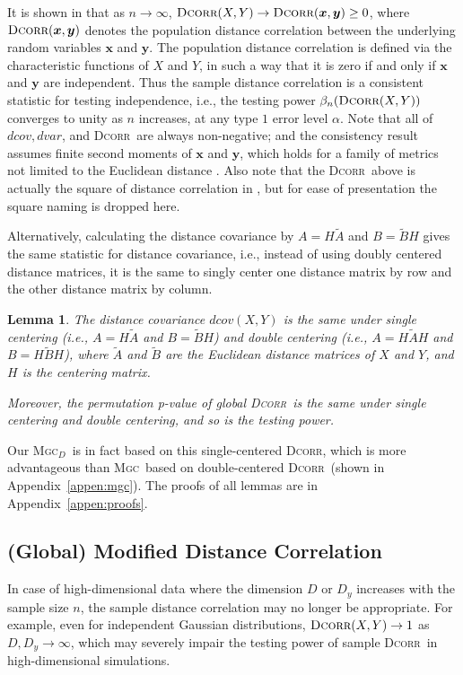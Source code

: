 \documentclass[11pt]{article}
\providecommand{\sct}[1]{{\normalfont\textsc{#1}}}
\providecommand{\mb}[1]{\boldsymbol{#1}}
\newcommand{\Mgc}{\sct{Mgc}}
\newcommand{\Mgcd}{\sct{Mgc$_D$}}
\newcommand{\Dcorr}{\sct{Dcorr}}
\newtheorem{lem}{Lemma}
\begin{document}
It is shown in \cite{SzekelyRizzoBakirov2007} that as $n \rightarrow \infty$, $\Dcorr(X,Y) \rightarrow \Dcorr(\mb{x},\mb{y}) \geq 0$, where $\Dcorr(\mb{x},\mb{y})$ denotes the population distance correlation between the underlying random variables $\mb{x}$ and $\mb{y}$. The population distance correlation is defined via the characteristic functions of $X$ and $Y$, in such a way that it is zero if and only if $\mb{x}$ and $\mb{y}$ are independent. Thus the sample distance correlation is a consistent statistic for testing independence, i.e., the testing power $\beta_{n}(\Dcorr(X,Y))$
converges to unity as $n$ increases, at any type $1$ error level $\alpha$. Note that all of $dcov, dvar$, and \Dcorr~are always non-negative; and the consistency result assumes finite second moments of $\mb{x}$ and $\mb{y}$, which holds for a family of metrics not limited to the Euclidean distance \cite{Lyons2013}. Also note that the \Dcorr~above is actually the square of distance correlation in \cite{SzekelyRizzoBakirov2007}, but for ease of presentation the square naming is dropped here.

Alternatively, calculating the distance covariance by $A=H\tilde{A}$ and $B=\tilde{B}H$ gives the same statistic for distance covariance, i.e., instead of using doubly centered distance matrices, it is the same to singly center one distance matrix by row and the other distance matrix by column.
\begin{lem}
The distance covariance $dcov(X,Y)$ is the same under single centering (i.e., $A=H\tilde{A}$ and $B=\tilde{B}H$) and double centering (i.e., $A=H\tilde{A}H$ and $B=H\tilde{B}H$), where $\tilde{A}$ and $\tilde{B}$ are the Euclidean distance matrices of $X$ and $Y$, and $H$ is the centering matrix. 

Moreover, the permutation p-value of global \Dcorr~is the same under single centering and double centering, and so is the testing power.
\end{lem}
Our \Mgcd~is in fact based on this single-centered \Dcorr, which is more advantageous than \Mgc~based on double-centered \Dcorr~(shown in Appendix~\ref{appen:mgc}). The proofs of all lemmas are in Appendix~\ref{appen:proofs}.



\subsection{(Global) Modified Distance Correlation}
\label{appen:mcorr}
In case of high-dimensional data where the dimension $D$ or $D_y$ increases with the sample size $n$, the sample distance correlation may no longer be appropriate. For example, even for independent Gaussian distributions, $\Dcorr(X,Y) \rightarrow 1$ as $D, D_y \rightarrow \infty$, which may severely impair the testing power of sample \Dcorr~in high-dimensional simulations.
\end{document}
